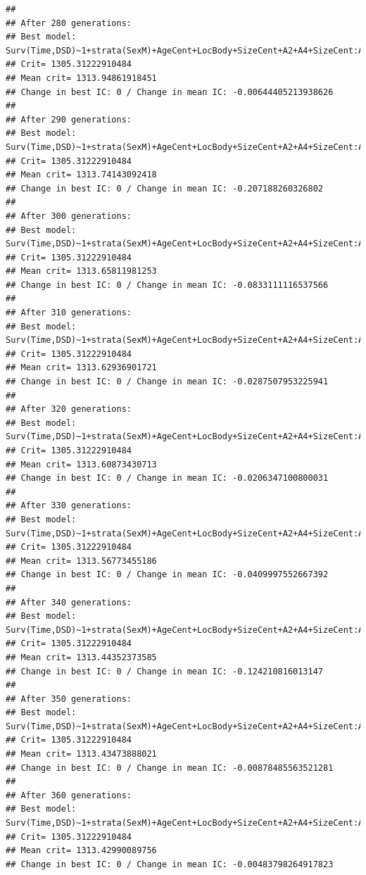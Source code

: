 \documentclass{article}\usepackage[]{graphicx}\usepackage[]{color}
\makeatletter
\newenvironment{kframe}{%
 \def\at@end@of@kframe{}%
 \ifinner\ifhmode%
  \def\at@end@of@kframe{\end{minipage}}%
  \begin{minipage}{\columnwidth}%
 \fi\fi%
 \def\FrameCommand##1{\hskip\@totalleftmargin \hskip-\fboxsep
 \colorbox{shadecolor}{##1}\hskip-\fboxsep
     \hskip-\linewidth \hskip-\@totalleftmargin \hskip\columnwidth}%
 \MakeFramed {\advance\hsize-\width
   \@totalleftmargin\z@ \linewidth\hsize
   \@setminipage}}%
 {\par\unskip\endMakeFramed%
 \at@end@of@kframe}
\newenvironment{knitrout}{}{} %
\makeatother
\begin{document}
\begin{knitrout}
\begin{kframe}
{\ttfamily\noindent\color{warningcolor}{\#\# Warning in fitter(X, Y, strats, offset, init, control, weights = weights, : Loglik converged before variable\ \ 2 ; beta may be infinite.}}\begin{verbatim}
## 
## After 280 generations:
## Best model: Surv(Time,DSD)~1+strata(SexM)+AgeCent+LocBody+SizeCent+A2+A4+SizeCent:AgeCent+strata(SexM):SizeCent
## Crit= 1305.31222910484
## Mean crit= 1313.94861918451
## Change in best IC: 0 / Change in mean IC: -0.00644405213938626
## 
## After 290 generations:
## Best model: Surv(Time,DSD)~1+strata(SexM)+AgeCent+LocBody+SizeCent+A2+A4+SizeCent:AgeCent+strata(SexM):SizeCent
## Crit= 1305.31222910484
## Mean crit= 1313.74143092418
## Change in best IC: 0 / Change in mean IC: -0.207188260326802
## 
## After 300 generations:
## Best model: Surv(Time,DSD)~1+strata(SexM)+AgeCent+LocBody+SizeCent+A2+A4+SizeCent:AgeCent+strata(SexM):SizeCent
## Crit= 1305.31222910484
## Mean crit= 1313.65811981253
## Change in best IC: 0 / Change in mean IC: -0.0833111116537566
## 
## After 310 generations:
## Best model: Surv(Time,DSD)~1+strata(SexM)+AgeCent+LocBody+SizeCent+A2+A4+SizeCent:AgeCent+strata(SexM):SizeCent
## Crit= 1305.31222910484
## Mean crit= 1313.62936901721
## Change in best IC: 0 / Change in mean IC: -0.0287507953225941
## 
## After 320 generations:
## Best model: Surv(Time,DSD)~1+strata(SexM)+AgeCent+LocBody+SizeCent+A2+A4+SizeCent:AgeCent+strata(SexM):SizeCent
## Crit= 1305.31222910484
## Mean crit= 1313.60873430713
## Change in best IC: 0 / Change in mean IC: -0.0206347100800031
## 
## After 330 generations:
## Best model: Surv(Time,DSD)~1+strata(SexM)+AgeCent+LocBody+SizeCent+A2+A4+SizeCent:AgeCent+strata(SexM):SizeCent
## Crit= 1305.31222910484
## Mean crit= 1313.56773455186
## Change in best IC: 0 / Change in mean IC: -0.0409997552667392
## 
## After 340 generations:
## Best model: Surv(Time,DSD)~1+strata(SexM)+AgeCent+LocBody+SizeCent+A2+A4+SizeCent:AgeCent+strata(SexM):SizeCent
## Crit= 1305.31222910484
## Mean crit= 1313.44352373585
## Change in best IC: 0 / Change in mean IC: -0.124210816013147
## 
## After 350 generations:
## Best model: Surv(Time,DSD)~1+strata(SexM)+AgeCent+LocBody+SizeCent+A2+A4+SizeCent:AgeCent+strata(SexM):SizeCent
## Crit= 1305.31222910484
## Mean crit= 1313.43473888021
## Change in best IC: 0 / Change in mean IC: -0.00878485563521281
## 
## After 360 generations:
## Best model: Surv(Time,DSD)~1+strata(SexM)+AgeCent+LocBody+SizeCent+A2+A4+SizeCent:AgeCent+strata(SexM):SizeCent
## Crit= 1305.31222910484
## Mean crit= 1313.42990089756
## Change in best IC: 0 / Change in mean IC: -0.00483798264917823
\end{verbatim}



\end{kframe}
\end{knitrout}
\end{document}
